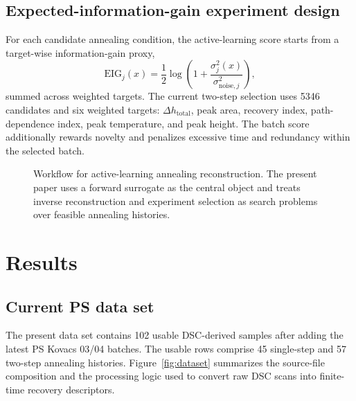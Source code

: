 \documentclass[11pt]{article}
\newcommand{\Tone}{\ensuremath{T_{1}}}
\newcommand{\ToneTime}{\ensuremath{t_{1}}}
\newcommand{\Ttwo}{\ensuremath{T_{2}}}
\newcommand{\TtwoTime}{\ensuremath{t_{2}}}
\newcommand{\EIG}{\ensuremath{\mathrm{EIG}}}
\begin{document}
\subsection{Expected-information-gain experiment design}
For each candidate annealing condition, the active-learning score starts from a target-wise information-gain proxy,
\begin{equation}
  \EIG_j(x) =
  \frac{1}{2}\log\left(1+
  \frac{\sigma_j^2(x)}{\sigma_{\mathrm{noise},j}^2}\right),
  \label{eq:eig}
\end{equation}
summed across weighted targets. The current two-step selection uses 5346 candidates and six weighted targets: $\Delta h_{\mathrm{total}}$, peak area, recovery index, path-dependence index, peak temperature, and peak height. The batch score additionally rewards novelty and penalizes excessive time and redundancy within the selected batch.

\begin{figure}[t]
\centering
{}
\caption{Workflow for active-learning annealing reconstruction. The present paper uses a forward surrogate as the central object and treats inverse reconstruction and experiment selection as search problems over feasible annealing histories.}
\label{fig:workflow}
\end{figure}

\section{Results}
\subsection{Current PS data set}
The present data set contains 102 usable DSC-derived samples after adding the latest PS Kovacs 03/04 batches. The usable rows comprise 45 single-step and 57 two-step annealing histories. Figure~\ref{fig:dataset} summarizes the source-file composition and the processing logic used to convert raw DSC scans into finite-time recovery descriptors.
\end{document}
